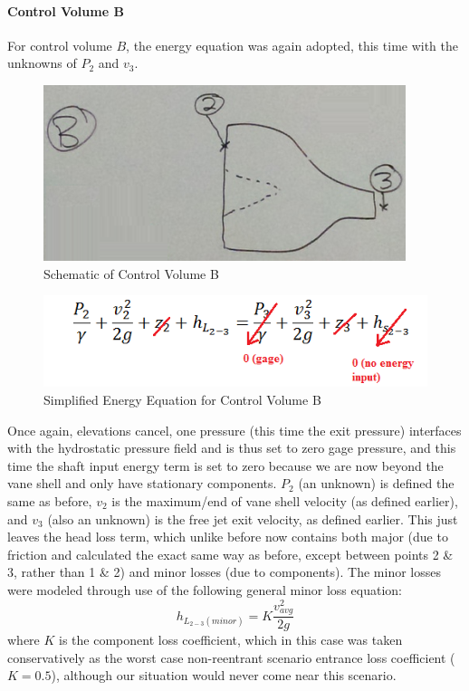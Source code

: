 \documentclass{report}
\begin{document}
\paragraph{Control Volume B}\par
For control volume $B$, the energy equation was again adopted, this time with the unknowns of $P_2$ and $v_3$.
\begin{figure}[h]
\centering
\includegraphics{"Control Volume B"}
\caption{Schematic of Control Volume B}
\end{figure}
\begin{figure}[h]
\centering
\includegraphics{"Eqn B"}
\caption{Simplified Energy Equation for Control Volume B}
\end{figure}
Once again, elevations cancel, one pressure (this time the exit pressure) interfaces with the hydrostatic pressure field and is thus set to zero gage pressure, and this time the shaft input energy term is set to zero because we are now beyond the vane shell and only have stationary components.  $P_2$ (an unknown) is defined the same as before, $v_2$ is the maximum/end of vane shell velocity (as defined earlier), and $v_3$ (also an unknown) is the free jet exit velocity, as defined earlier.  This just leaves the head loss term, which unlike before now contains both major (due to friction and calculated the exact same way as before, except between points 2 \& 3, rather than 1 \& 2) and minor losses (due to components).  The minor losses were modeled through use of the following general minor loss equation:
\begin{equation}
h_{L_{2-3}(minor)}=K\frac{v_{avg}^2}{2g}
\end{equation}
where $K$ is the component loss coefficient, which in this case was taken conservatively as the worst case non-reentrant scenario entrance loss coefficient ($K=0.5$), although our situation would never come near this scenario.
\end{document}
